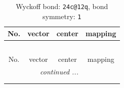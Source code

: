 \documentclass[fleqn,8pt]{jsarticle}
\begin{document}
\renewcommand{\arraystretch}{1.2}
\begin{longtable}{cccc}
\caption{Wyckoff bond: {\tt 24c@12q}, bond symmetry: {\tt 1}}
 \\
 \hline \hline
No. & vector & center & mapping \\ \hline \endfirsthead

\multicolumn{3}{l}{\tablename\ \thetable{}} \\
 \hline \hline
No. & vector & center & mapping \\ \hline \endhead

 \hline \hline
\multicolumn{3}{r}{\footnotesize\it continued ...} \\ \endfoot

 \hline \hline
\multicolumn{3}{r}{} \\ \endlastfoot


\end{longtable}
\end{document}
